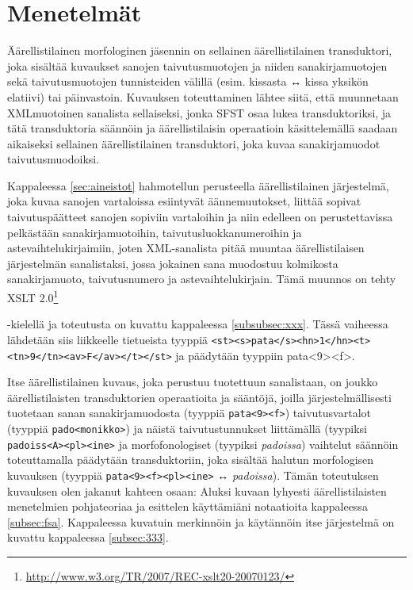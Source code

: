\documentclass[free]{flammie}
\begin{document}
\section{Menetelmät}\label{sec:mentelmat}

Äärellistilainen morfologinen jäsennin on sellainen äärellistilainen transduktori,
joka sisältää kuvaukset sanojen taivutusmuotojen ja niiden sanakirjamuotojen sekä taivutusmuotojen tunnisteiden välillä (esim. kissasta ↔ kissa yksikön elatiivi) tai päinvastoin. Kuvauksen toteuttaminen lähtee siitä, että muunnetaan XMLmuotoinen sanalista sellaiseksi, jonka SFST osaa lukea transduktoriksi, ja tätä
transduktoria säännöin ja äärellistilaisin operaatioin käsittelemällä saadaan aikaiseksi sellainen äärellistilainen transduktori, joka kuvaa sanakirjamuodot taivutusmuodoiksi.

Kappaleessa \ref{sec:aineistot} hahmotellun perusteella äärellistilainen järjestelmä, joka kuvaa
sanojen vartaloissa esiintyvät äännemuutokset, liittää sopivat taivutuspäätteet
sanojen sopiviin vartaloihin ja niin edelleen on perustettavissa pelkästään
sanakirjamuotoihin, taivutusluokkanumeroihin ja astevaihtelukirjaimiin, joten
XML-sanalista pitää muuntaa äärellistilaisen järjestelmän sanalistaksi, jossa
jokainen sana muodostuu kolmikosta sanakirjamuoto, taivutusnumero ja
astevaihtelukirjain. Tämä muunnos on tehty XSLT
2.0\footnote{\url{http://www.w3.org/TR/2007/REC-xslt20-20070123/}}

-kielellä ja toteutusta on kuvattu kappaleessa \ref{subsubsec:xxx}. Tässä vaiheessa lähdetään siis liikkeelle tietueista tyyppiä
\texttt{<st><s>pata</s><hn>1</hn><t><tn>9</tn><av>F</av></t></st>}
ja päädytään tyyppiin pata<9><f>.

Itse äärellistilainen kuvaus, joka perustuu tuotettuun sanalistaan, on joukko
äärellistilaisten transduktorien operaatioita ja sääntöjä, joilla
järjestelmällisesti tuotetaan sanan sanakirjamuodosta (tyyppiä
\texttt{pata<9><f>}) taivutusvartalot
(tyyppiä \texttt{pado<monikko>}) ja näistä taivutustunnukset liittämällä (tyypiksi
\texttt{padoiss<A><pl><ine>} ja morfofonologiset (tyypiksi \textit{padoissa}) vaihtelut
säännöin toteuttamalla päädytään transduktoriin, joka sisältää halutun morfologisen kuvauksen (tyyppiä
\texttt{pata<9><f><pl><ine>} ↔ \textit{padoissa}). Tämän
toteutuksen kuvauksen olen jakanut kahteen osaan: Aluksi kuvaan lyhyesti
äärellistilaisten menetelmien pohjateoriaa ja esittelen käyttämiäni notaatioita
kappaleessa \ref{subsec:fsa}. Kappaleessa kuvatuin merkinnöin ja käytännöin itse järjestelmä on
kuvattu kappaleessa \ref{subsec:333}.
\end{document}

